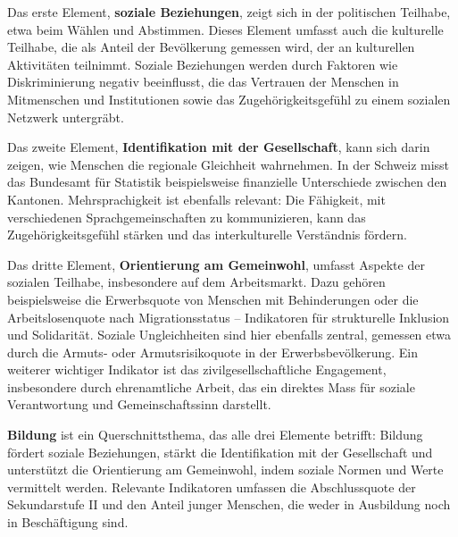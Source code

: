 \documentclass[
  nswissgerman,
  a4paper,
  openany]{book}
\begin{document}
Das erste Element, \textbf{soziale Beziehungen}, zeigt sich in der
politischen Teilhabe, etwa beim Wählen und Abstimmen. Dieses Element
umfasst auch die kulturelle Teilhabe, die als Anteil der Bevölkerung
gemessen wird, der an kulturellen Aktivitäten teilnimmt. Soziale
Beziehungen werden durch Faktoren wie Diskriminierung negativ
beeinflusst, die das Vertrauen der Menschen in Mitmenschen und
Institutionen sowie das Zugehörigkeitsgefühl zu einem sozialen Netzwerk
untergräbt.

Das zweite Element, \textbf{Identifikation mit der Gesellschaft}, kann
sich darin zeigen, wie Menschen die regionale Gleichheit wahrnehmen. In
der Schweiz misst das Bundesamt für Statistik beispielsweise finanzielle
Unterschiede zwischen den Kantonen. Mehrsprachigkeit ist ebenfalls
relevant: Die Fähigkeit, mit verschiedenen Sprachgemeinschaften zu
kommunizieren, kann das Zugehörigkeitsgefühl stärken und das
interkulturelle Verständnis fördern.

Das dritte Element, \textbf{Orientierung am Gemeinwohl}, umfasst Aspekte
der sozialen Teilhabe, insbesondere auf dem Arbeitsmarkt. Dazu gehören
beispielsweise die Erwerbsquote von Menschen mit Behinderungen oder die
Arbeitslosenquote nach Migrationsstatus -- Indikatoren für strukturelle
Inklusion und Solidarität. Soziale Ungleichheiten sind hier ebenfalls
zentral, gemessen etwa durch die Armuts- oder Armutsrisikoquote in der
Erwerbsbevölkerung. Ein weiterer wichtiger Indikator ist das
zivilgesellschaftliche Engagement, insbesondere durch ehrenamtliche
Arbeit, das ein direktes Mass für soziale Verantwortung und
Gemeinschaftssinn darstellt.

\textbf{Bildung} ist ein Querschnittsthema, das alle drei Elemente
betrifft: Bildung fördert soziale Beziehungen, stärkt die Identifikation
mit der Gesellschaft und unterstützt die Orientierung am Gemeinwohl,
indem soziale Normen und Werte vermittelt werden. Relevante Indikatoren
umfassen die Abschlussquote der Sekundarstufe II und den Anteil junger
Menschen, die weder in Ausbildung noch in Beschäftigung sind.

\begingroup\fontsize{8}{10}\selectfont
\end{document}
